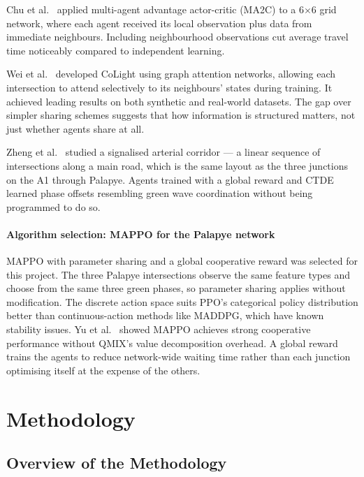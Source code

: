 \documentclass[11pt, a4paper]{report}
\begin{document}
Chu et al.\ \cite{chu2019multi} applied multi-agent advantage actor-critic (MA2C) to a 6$\times$6 grid network, where each agent received its local observation plus data from immediate neighbours. Including neighbourhood observations cut average travel time noticeably compared to independent learning.

Wei et al.\ \cite{wei2019colight} developed CoLight using graph attention networks, allowing each intersection to attend selectively to its neighbours' states during training. It achieved leading results on both synthetic and real-world datasets. The gap over simpler sharing schemes suggests that how information is structured matters, not just whether agents share at all.

Zheng et al.\ \cite{zheng2019learning} studied a signalised arterial corridor --- a linear sequence of intersections along a main road, which is the same layout as the three junctions on the A1 through Palapye. Agents trained with a global reward and CTDE learned phase offsets resembling green wave coordination without being programmed to do so.

\subsubsection{Algorithm selection: MAPPO for the Palapye network}

MAPPO with parameter sharing and a global cooperative reward was selected for this project. The three Palapye intersections observe the same feature types and choose from the same three green phases, so parameter sharing applies without modification. The discrete action space suits PPO's categorical policy distribution better than continuous-action methods like MADDPG, which have known stability issues. Yu et al.\ \cite{yu2022surprising} showed MAPPO achieves strong cooperative performance without QMIX's value decomposition overhead. A global reward trains the agents to reduce network-wide waiting time rather than each junction optimising itself at the expense of the others.

\chapter{Methodology}

\section{Overview of the Methodology}
\end{document}

